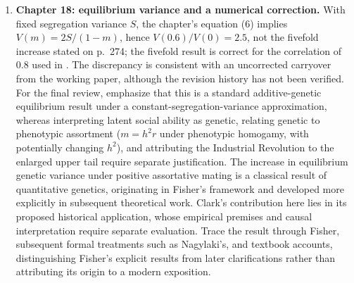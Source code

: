 \documentclass[12pt]{article}
\renewenvironment{itemize}{\begin{enumerate}}{\end{enumerate}}
\begin{document}
\begin{itemize}
Supporting qualifications: genetic additivity alone does not guarantee
an exactly linear conditional mean; linearity, contraction and symmetry
about a common population mean require distinct assumptions; the high
reported $R^2$ values for grouped means are not individual-level
explanatory power or formal tests against nonlinearities; and symmetry
of log deviations is not equality of ordinary percentage changes.
Keep these qualifications subordinate to the identification criticism.
The source-checked quotations, graphical slope estimates, identity-line
replots and mathematical counterexamples are saved in the
Chapter~14 audit dated 23 September 2026 in the project notes.

\item \textbf{Chapter 18: equilibrium variance and a numerical correction.}
With fixed segregation variance $S$, the chapter's equation (6) implies
$V(m)=2S/(1-m)$, hence $V(0.6)/V(0)=2.5$, not the fivefold increase
stated on p.~274; the fivefold result is correct for the correlation
of $0.8$ used in \citet[pp.~3--4]{ClarkCummins2022}.
The discrepancy is consistent with an uncorrected carryover from the
working paper, although the revision history has not been verified.
For the final review, emphasize that this is a standard additive-genetic
equilibrium result under a constant-segregation-variance approximation,
whereas interpreting latent social ability as genetic, relating genetic
to phenotypic assortment ($m=h^2r$ under phenotypic homogamy, with
potentially changing $h^2$), and attributing the Industrial Revolution
to the enlarged upper tail require separate justification.
The increase in equilibrium genetic variance under positive assortative
mating is a classical result of quantitative genetics, originating in
Fisher's framework and developed more explicitly in subsequent theoretical
work. Clark's contribution here lies in its proposed historical application,
whose empirical premises and causal interpretation require separate
evaluation. Trace the result through Fisher, subsequent formal treatments
such as Nagylaki's, and textbook accounts, distinguishing Fisher's explicit
results from later clarifications rather than attributing its origin to
a modern exposition.


\end{itemize}
\end{document}
